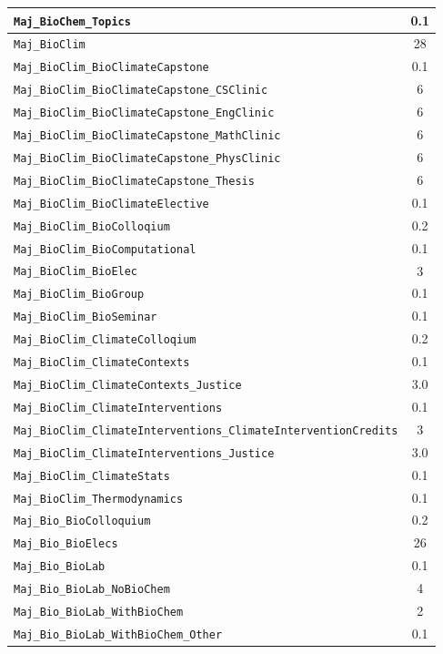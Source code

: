 \begin{longtable}{|p{}|c|}
    \verb|Maj_BioChem_Topics| & 0.1\\\hline
    \verb|Maj_BioClim| & 28\\\hline
    \verb|Maj_BioClim_BioClimateCapstone| & 0.1\\\hline
    \verb|Maj_BioClim_BioClimateCapstone_CSClinic| & 6\\\hline
    \verb|Maj_BioClim_BioClimateCapstone_EngClinic| & 6\\\hline
    \verb|Maj_BioClim_BioClimateCapstone_MathClinic| & 6\\\hline
    \verb|Maj_BioClim_BioClimateCapstone_PhysClinic| & 6\\\hline
    \verb|Maj_BioClim_BioClimateCapstone_Thesis| & 6\\\hline
    \verb|Maj_BioClim_BioClimateElective| & 0.1\\\hline
    \verb|Maj_BioClim_BioColloqium| & 0.2\\\hline
    \verb|Maj_BioClim_BioComputational| & 0.1\\\hline
    \verb|Maj_BioClim_BioElec| & 3\\\hline
    \verb|Maj_BioClim_BioGroup| & 0.1\\\hline
    \verb|Maj_BioClim_BioSeminar| & 0.1\\\hline
    \verb|Maj_BioClim_ClimateColloqium| & 0.2\\\hline
    \verb|Maj_BioClim_ClimateContexts| & 0.1\\\hline
    \verb|Maj_BioClim_ClimateContexts_Justice| & 3.0\\\hline
    \verb|Maj_BioClim_ClimateInterventions| & 0.1\\\hline
    \verb|Maj_BioClim_ClimateInterventions_ClimateInterventionCredits| & 3\\\hline
    \verb|Maj_BioClim_ClimateInterventions_Justice| & 3.0\\\hline
    \verb|Maj_BioClim_ClimateStats| & 0.1\\\hline
    \verb|Maj_BioClim_Thermodynamics| & 0.1\\\hline
    \verb|Maj_Bio_BioColloquium| & 0.2\\\hline
    \verb|Maj_Bio_BioElecs| & 26\\\hline
    \verb|Maj_Bio_BioLab| & 0.1\\\hline
    \verb|Maj_Bio_BioLab_NoBioChem| & 4\\\hline
    \verb|Maj_Bio_BioLab_WithBioChem| & 2\\\hline
    \verb|Maj_Bio_BioLab_WithBioChem_Other| & 0.1\\\hline

\end{longtable}
